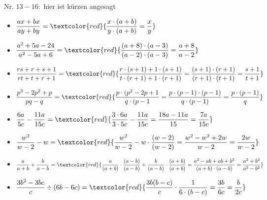 \documentclass[11pt, a4paper, twoside, fleqn]{article}
\begin{document}
Nr. $ 13 -16:$ hier ist kürzen angesagt
\begin{itemize}[itemsep=3ex , leftmargin=*]
\item $ \dfrac{ax + bx}{ay + by} = \textcolor{red}{\dfrac{x \cdot (a+b)}{y \cdot (a+b)} = \dfrac{x}{y}} $
\item $ \dfrac{a^{2} + 5a -24}{a^{2} - 5a + 6} = \textcolor{red}{\dfrac{(a + 8) \cdot (a - 3)}{(a - 2) \cdot (a-3)} = \dfrac{a + 8}{a - 2}} $
\item $ \dfrac{rs + r + s + 1}{rt + t +r + 1} = \textcolor{red}{\dfrac{r \cdot (s + 1) + 1 \cdot(s + 1)}{t \cdot(r + 1) +1 \cdot (r + 1)} = \dfrac{(s + 1) \cdot (r + 1)}{(r + 1) \cdot (t + 1)} = \dfrac{s + 1}{t + 1}} $
\item $ \dfrac{p^{3} - 2p^{2} + p}{pq - q} = \textcolor{red}{\dfrac{p \cdot (p^{2} - 2p + 1}{q \cdot (p - 1} = \dfrac{p \cdot (p - 1) \cdot (p - 1)}{q \cdot (p-1)} = \dfrac{p \cdot (p - 1)}{q}} $ 
\item $ \dfrac{6a}{5c} - \dfrac{11a}{15c} = \textcolor{red}{\dfrac{3 \cdot 6a}{3 \cdot 5c} - \dfrac{11a}{15c} = \dfrac{18a - 11a}{15}= \dfrac{7a}{15c}} $
\item $ \dfrac{w^{2}}{w - 2} - w = \textcolor{red}{\dfrac{w^{2}}{w - 2} - w \cdot \dfrac{(w - 2)}{(w - 2)} = \dfrac{w^{2} - w^{2} + 2w}{w - 2} = \dfrac{2w}{w - 2}} $
\item $ \dfrac{a}{a + b} + \dfrac{b}{a - b} = \textcolor{red}{\dfrac{a}{(a + b)} \cdot \dfrac{(a - b)}{(a - b)} + \dfrac{b}{(a - b)} \cdot \dfrac{
(a + b)}{(a + b)} = \dfrac{ a^{2} - ab + ab + b^{2}}{(a + b) \cdot (a - b)} = \dfrac{a^{2} + b^{2}}{a^{2} - b^{2}}} $
\item $ \dfrac{3b^{2} - 3bc}{c} \div (6b - 6c) = \textcolor{red}{\dfrac{3b(b - c)}{c} \cdot \dfrac{1}{6 \cdot (b - c)} = \dfrac{3b}{6c} = \dfrac{b}{2c}} $
\end{itemize}
\end{document}
